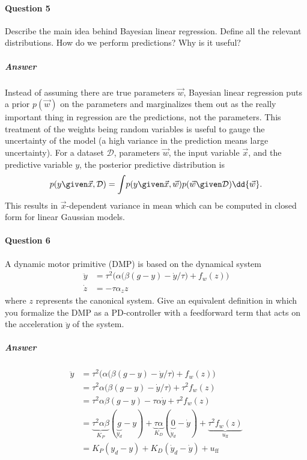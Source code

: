 	\paragraph{Question 5}
		Describe the main idea behind Bayesian linear regression. Define all the relevant distributions. How do we perform predictions? Why is it useful?

		\subparagraph{Answer}
			Instead of assuming there are true parameters \(\vec{w}\), Bayesian linear regression puts a prior \(p(\vec{w})\) on the parameters and marginalizes them out as the really important thing in regression are the predictions, not the parameters. This treatment of the weights being random variables is useful to gauge the uncertainty of the model (a high variance in the prediction means large uncertainty). For a dataset \(\mathcal{D}\), parameters \(\vec{w}\), the input variable \(\vec{x}\), and the predictive variable \(y\), the posterior predictive distribution is
			\begin{equation*}
				p(y \given \vec{x}, \mathcal{D}) = \int\! p(y \given \vec{x}, \vec{w}) p(\vec{w} \given \mathcal{D}) \dd{\vec{w}}.
			\end{equation*}
			This results in \(\vec{x}\)-dependent variance in mean which can be computed in closed form for linear Gaussian models.

	\paragraph{Question 6}
		A dynamic motor primitive (DMP) is based on the dynamical system
		\begin{align*}
			\ddot{y} & = \tau^2 \Big( \alpha \big( \beta (g - y) - \dot{y} / \tau \big) + f_w(z) \Big) \\
			\dot{z}  & = -\tau \alpha_z z
		\end{align*}
		where \(z\) represents the canonical system. Give an equivalent definition in which you formalize the DMP as a PD-controller with a feedforward term that acts on the acceleration \(\ddot{y}\) of the system.

		\subparagraph{Answer}
			\begin{align*}
				\ddot{y}
				 & = \tau^2 \Big( \alpha \big( \beta (g - y) - \dot{y} / \tau \big) + f_w(z) \Big)                                                                                                          \\
				 & = \tau^2 \alpha \big( \beta (g - y) - \dot{y} / \tau \big) + \tau^2 f_w(z)                                                                                                               \\
				 & = \tau^2 \alpha \beta (g - y) - \tau \alpha \dot{y} + \tau^2 f_w(z)                                                                                                                      \\
				 & = \underbrace{\tau^2 \alpha \beta}_{K_P} (\underbrace{g}_{y_d} - y) + \underbrace{\tau \alpha}_{K_D} (\underbrace{0}_{\dot{y}_d} - \dot{y}) + \underbrace{\tau^2 f_w(z)}_{u_\mathrm{ff}} \\
				 & = K_P (y_d - y) + K_D (\dot{y}_d - \dot{y}) + u_\mathrm{ff}
			\end{align*}

